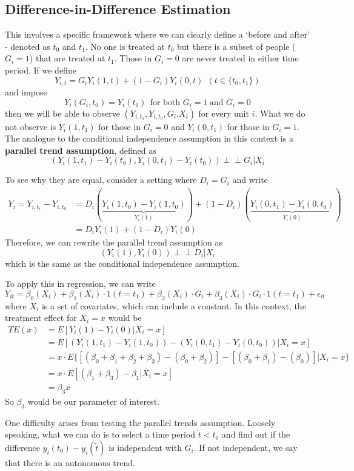 \documentclass[12pt]{article}
\theoremstyle{definition}
\theoremstyle{property}
\theoremstyle{assumption}
\theoremstyle{example}
\theoremstyle{comment}
\begin{document}
\subsection{Difference-in-Difference Estimation}
This involves a specific framework where we can clearly define a `before and after' - denoted as $t_0$ and $t_1$. No one is treated at $t_0$ but there is a subset of people ($G_i=1$) that are treated at $t_1$. Those in $G_i=0$ are never treated in either time period. If we define
\[
Y_{i,t}=G_iY_{i}(1,t)+(1-G_i)Y_{i}(0,t) \ \ (t\in\{t_0, t_1\})
\]
and impose
\[
Y_i(G_i, t_0)=Y_{i}(t_0) \ \ \text{for both }G_i=1 \ \text{and }G_i=0 
\]
then we will be able to observe $(Y_{i,t_1}, Y_{i,t_0},G_i. X_i)$ for every unit $i$. What we do not observe is $Y_i(1,t_1)$ for those in $G_i=0$ and $Y_i(0,t_1)$ for those in $G_i=1$.  The analogue to the conditional independence assumption in this context is a \textbf{parallel trend assumption}, defined as
\[
(Y_i(1,t_1)-Y_i(t_0), Y_i(0,t_1)-Y_i(t_0)) \perp\!\!\! \perp G_i|X_i
\]\par
To see why they are equal, consider a setting where $D_i=G_i$ and write
\begin{align*}
Y_i = Y_{i,t_1}-Y_{i,t_0}&=D_i(\underbrace{Y_i(1,t_0)-Y_i(1,t_0)}_{Y_i(1)})+(1-D_i)(\underbrace{Y_i(0,t_1)-Y_i(0,t_0)}_{Y_i(0)})\\
&=D_iY_i(1) + (1-D_i)Y_i(0)
\end{align*}
Therefore, we can rewrite the parallel trend assumption as
\[
(Y_i(1), Y_i(0)) \perp\!\!\! \perp D_i|X_i
\]
which is the same as the conditional independence assumption. \par
To apply this in regression, we can write
\[
Y_{it}=\beta_0(X_i)+\beta_1(X_i)\cdot1(t=t_1)+\beta_2(X_i)\cdot G_i + \beta_3(X_i)\cdot G_i\cdot1(t=t_1)+\epsilon_{it}
\]
where $X_i$ is a set of covariates, which can include a constant. In this context, the treatment effect for $X_i=x$ would be
\begin{align*}
TE(x)&=E[Y_i(1)-Y_i(0)|X_i=x]\\
&=E[(Y_i(1,t_1)-Y_i(1,t_0))-(Y_i(0,t_1)-Y_i(0,t_0))|X_i=x]\\
&=x\cdot E\{[(\beta_0+\beta_1+\beta_2+\beta_3)-(\beta_0+\beta_2)]-[(\beta_0+\beta_1)-(\beta_0)]|X_i=x\}\\
&=x\cdot E[(\beta_1+\beta_3)-\beta_1|X_i=x]\\
&=\beta_3 x
\end{align*}
So $\beta_3$ would be our parameter of interest. \par
One difficulty arises from testing the parallel trends assumption. Loosely speaking, what we can do is to select a time period $\tilde{t}<t_0$ and find out if the difference $y_i(t_0)-y_i(\tilde{t})$ is independent with $G_i$. If not independent, we say that there is an autonomous trend. 
\end{document}
